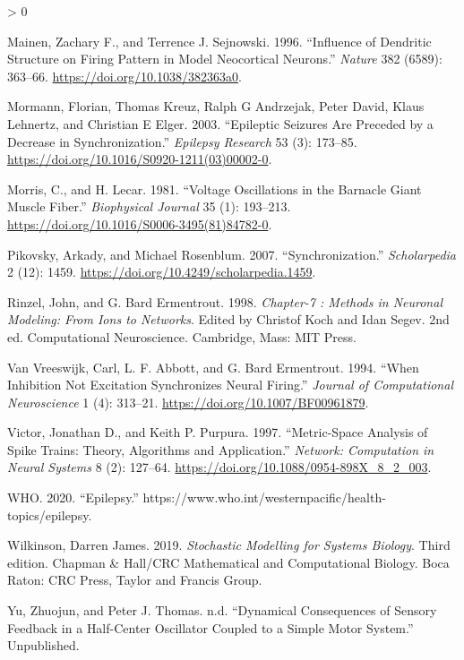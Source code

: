 \documentclass[
]{article}
\newlength{\cslhangindent}
\newenvironment{CSLReferences}[2] %
 {%
  \setlength{\parindent}{0pt}
  \ifodd #1 \everypar{\setlength{\hangindent}{\cslhangindent}}\ignorespaces\fi
  \ifnum #2 > 0
  \setlength{\parskip}{#2\baselineskip}
  \fi
 }%
 {}
\begin{document}
\begin{CSLReferences}{1}{0}
\leavevmode\hypertarget{ref-mainen96influence}{}%
Mainen, Zachary F., and Terrence J. Sejnowski. 1996. {``Influence of Dendritic Structure on Firing Pattern in Model Neocortical Neurons.''} \emph{Nature} 382 (6589): 363--66. \url{https://doi.org/10.1038/382363a0}.

\leavevmode\hypertarget{ref-mormann03epileptic}{}%
Mormann, Florian, Thomas Kreuz, Ralph G Andrzejak, Peter David, Klaus Lehnertz, and Christian E Elger. 2003. {``Epileptic Seizures Are Preceded by a Decrease in Synchronization.''} \emph{Epilepsy Research} 53 (3): 173--85. \url{https://doi.org/10.1016/S0920-1211(03)00002-0}.

\leavevmode\hypertarget{ref-morris81voltage}{}%
Morris, C., and H. Lecar. 1981. {``Voltage Oscillations in the Barnacle Giant Muscle Fiber.''} \emph{Biophysical Journal} 35 (1): 193--213. \url{https://doi.org/10.1016/S0006-3495(81)84782-0}.

\leavevmode\hypertarget{ref-pikovsky07synchronization}{}%
Pikovsky, Arkady, and Michael Rosenblum. 2007. {``Synchronization.''} \emph{Scholarpedia} 2 (12): 1459. \url{https://doi.org/10.4249/scholarpedia.1459}.

\leavevmode\hypertarget{ref-rinzel98chapter7}{}%
Rinzel, John, and G. Bard Ermentrout. 1998. \emph{Chapter-7 : {Methods} in Neuronal Modeling: From Ions to Networks}. Edited by Christof Koch and Idan Segev. 2nd ed. Computational Neuroscience. {Cambridge, Mass}: {MIT Press}.

\leavevmode\hypertarget{ref-vanvreeswijk94when}{}%
Van Vreeswijk, Carl, L. F. Abbott, and G. Bard Ermentrout. 1994. {``When Inhibition Not Excitation Synchronizes Neural Firing.''} \emph{Journal of Computational Neuroscience} 1 (4): 313--21. \url{https://doi.org/10.1007/BF00961879}.

\leavevmode\hypertarget{ref-victor97metricspace}{}%
Victor, Jonathan D., and Keith P. Purpura. 1997. {``Metric-Space Analysis of Spike Trains: Theory, Algorithms and Application.''} \emph{Network: Computation in Neural Systems} 8 (2): 127--64. \url{https://doi.org/10.1088/0954-898X_8_2_003}.

\leavevmode\hypertarget{ref-who20epilepsy}{}%
WHO. 2020. {``Epilepsy.''} https://www.who.int/westernpacific/health-topics/epilepsy.

\leavevmode\hypertarget{ref-wilkinson19stochastic}{}%
Wilkinson, Darren James. 2019. \emph{Stochastic Modelling for Systems Biology}. Third edition. Chapman \& {Hall}/{CRC} Mathematical and Computational Biology. {Boca Raton}: {CRC Press, Taylor and Francis Group}.

\leavevmode\hypertarget{ref-yu00dynamical}{}%
Yu, Zhuojun, and Peter J. Thomas. n.d. {``Dynamical {Consequences} of {Sensory Feedback} in a {Half}-{Center Oscillator Coupled} to a {Simple Motor System}.''} {Unpublished}.

\end{CSLReferences}
\end{document}
